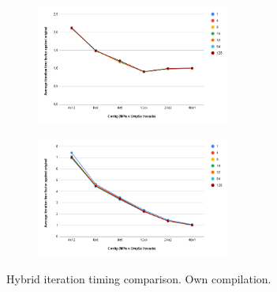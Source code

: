 \begin{figure}[ht]
  \begin{subfigure}{1\textwidth}
    \centering
    \includegraphics[width=0.7\textwidth]{graphics/hybridcompleteabs.png}

  \end{subfigure}
  \begin{subfigure}{1\textwidth}
    \centering
    \includegraphics[width=0.7\textwidth]{graphics/hybridreducedabs.png}
    \label{fig:plot-hybrid-int-red-it}

  \end{subfigure}

  \caption[Hybrid iteration timing comparison.]{Hybrid iteration timing comparison. Own compilation.}
  \label{fig:plot-hybrid-int-it}
\end{figure}


